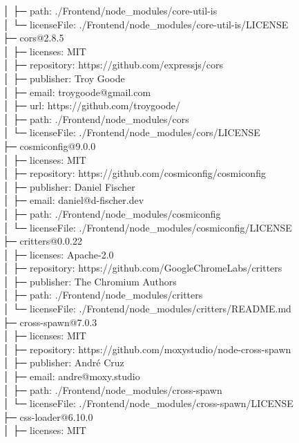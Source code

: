 │  ├─ path: ./Frontend/node\_modules/core-util-is\\
│  └─ licenseFile: ./Frontend/node\_modules/core-util-is/LICENSE\\
├─ cors@2.8.5\\
│  ├─ licenses: MIT\\
│  ├─ repository: https://github.com/expressjs/cors\\
│  ├─ publisher: Troy Goode\\
│  ├─ email: troygoode@gmail.com\\
│  ├─ url: https://github.com/troygoode/\\
│  ├─ path: ./Frontend/node\_modules/cors\\
│  └─ licenseFile: ./Frontend/node\_modules/cors/LICENSE\\
├─ cosmiconfig@9.0.0\\
│  ├─ licenses: MIT\\
│  ├─ repository: https://github.com/cosmiconfig/cosmiconfig\\
│  ├─ publisher: Daniel Fischer\\
│  ├─ email: daniel@d-fischer.dev\\
│  ├─ path: ./Frontend/node\_modules/cosmiconfig\\
│  └─ licenseFile: ./Frontend/node\_modules/cosmiconfig/LICENSE\\
├─ critters@0.0.22\\
│  ├─ licenses: Apache-2.0\\
│  ├─ repository: https://github.com/GoogleChromeLabs/critters\\
│  ├─ publisher: The Chromium Authors\\
│  ├─ path: ./Frontend/node\_modules/critters\\
│  └─ licenseFile: ./Frontend/node\_modules/critters/README.md\\
├─ cross-spawn@7.0.3\\
│  ├─ licenses: MIT\\
│  ├─ repository: https://github.com/moxystudio/node-cross-spawn\\
│  ├─ publisher: André Cruz\\
│  ├─ email: andre@moxy.studio\\
│  ├─ path: ./Frontend/node\_modules/cross-spawn\\
│  └─ licenseFile: ./Frontend/node\_modules/cross-spawn/LICENSE\\
├─ css-loader@6.10.0\\
│  ├─ licenses: MIT\\
